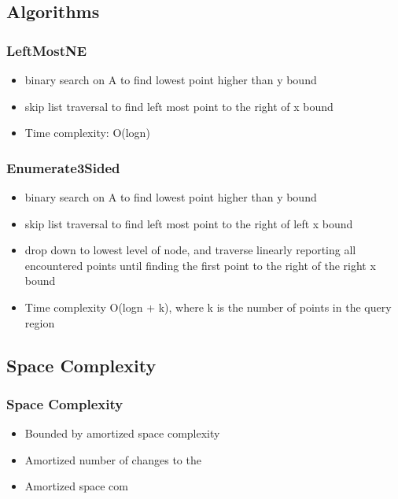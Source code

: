 \documentclass{beamer}
\begin{document}
\subsection{Algorithms}

\begin{frame}
  \frametitle{LeftMostNE}

  \begin{itemize}
  \item
    binary search on A to find lowest point higher than y bound
  \item
    skip list traversal to find left most point to the right of x bound
  \item
    Time complexity: O(logn)
  \end{itemize}

\end{frame}

\begin{frame}
  \frametitle{Enumerate3Sided}

  \begin{itemize}
  \item
    binary search on A to find lowest point higher than y bound
  \item
    skip list traversal to find left most point to the right of left x bound
  \item
    drop down to lowest level of node, and traverse linearly reporting all
    encountered points until finding the first point to the right of the right 
    x bound
  \item
    Time complexity O(logn + k), where k is the number of points in the 
    query region
  \end{itemize}
\end{frame}

\subsection{Space Complexity}

\begin{frame}
  \frametitle{Space Complexity}

  \begin{itemize}
  \item
    Bounded by amortized space complexity
  \item
    Amortized number of changes to the 
  \item
    Amortized space com
  \end{itemize}  
\end{frame}
\end{document}
